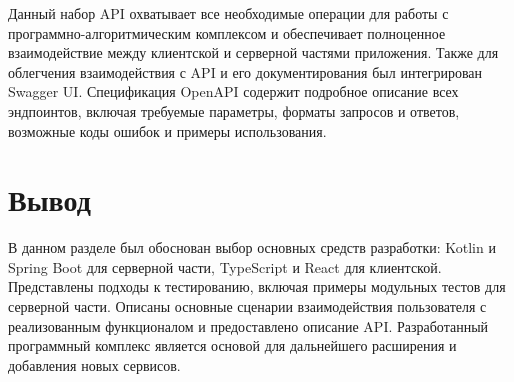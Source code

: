 Данный набор API охватывает все необходимые операции для работы с программно-алгоритмическим комплексом и обеспечивает полноценное взаимодействие между клиентской и серверной частями приложения.
Также для облегчения взаимодействия с API и его документирования был интегрирован Swagger UI. 
Спецификация OpenAPI содержит подробное описание всех эндпоинтов, включая требуемые параметры, форматы запросов и ответов, возможные коды ошибок и примеры использования. 

\section*{Вывод}

В данном разделе был обоснован выбор основных средств разработки: Kotlin и Spring Boot для серверной части, TypeScript и React для клиентской. 
Представлены подходы к тестированию, включая примеры модульных тестов для серверной части. 
Описаны основные сценарии взаимодействия пользователя с реализованным функционалом и предоставлено описание API.
Разработанный программный комплекс является основой для дальнейшего расширения и добавления новых сервисов.
